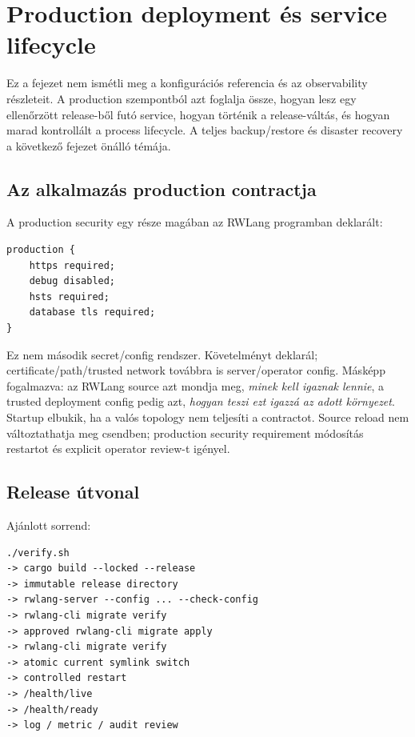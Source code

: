 \chapter{Production deployment és service lifecycle}

Ez a fejezet nem ismétli meg a konfigurációs referencia és az observability részleteit. A production szempontból azt foglalja össze, hogyan lesz egy ellenőrzött release-ből futó service, hogyan történik a release-váltás, és hogyan marad kontrollált a process lifecycle. A teljes backup/restore és disaster recovery a következő fejezet önálló témája.

\section{Az alkalmazás production contractja}

A production security egy része magában az RWLang programban deklarált:

\begin{lstlisting}[language=RWLang]
production {
    https required;
    debug disabled;
    hsts required;
    database tls required;
}
\end{lstlisting}

Ez nem második secret/config rendszer. Követelményt deklarál; certificate/path/trusted network továbbra is server/operator config. Másképp fogalmazva: az RWLang source azt mondja meg, \emph{minek kell igaznak lennie}, a trusted deployment config pedig azt, \emph{hogyan teszi ezt igazzá az adott környezet}. Startup elbukik, ha a valós topology nem teljesíti a contractot. Source reload nem változtathatja meg csendben; production security requirement módosítás restartot és explicit operator review-t igényel.

\section{Release útvonal}

Ajánlott sorrend:

\begin{lstlisting}
./verify.sh
-> cargo build --locked --release
-> immutable release directory
-> rwlang-server --config ... --check-config
-> rwlang-cli migrate verify
-> approved rwlang-cli migrate apply
-> rwlang-cli migrate verify
-> atomic current symlink switch
-> controlled restart
-> /health/live
-> /health/ready
-> log / metric / audit review
\end{lstlisting}


